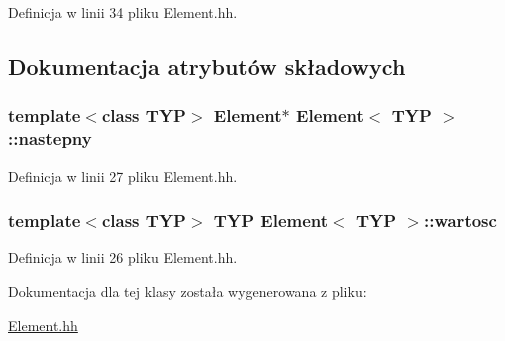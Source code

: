 Definicja w linii 34 pliku Element.hh.



\subsection{Dokumentacja atrybutów składowych}
\hypertarget{class_element_a1af602058c187cccf3f50d0c1a21047d}{
\subsubsection[{nastepny}]{\setlength{\rightskip}{0pt plus 5cm}template$<$class TYP$>$ {\bf Element}$\ast$ {\bf Element}$<$ TYP $>$::{\bf nastepny}}}
\label{class_element_a1af602058c187cccf3f50d0c1a21047d}


Definicja w linii 27 pliku Element.hh.

\hypertarget{class_element_a686c632e35d9fe961d0bf5482e1215fd}{
\subsubsection[{wartosc}]{\setlength{\rightskip}{0pt plus 5cm}template$<$class TYP$>$ TYP {\bf Element}$<$ TYP $>$::{\bf wartosc}}}
\label{class_element_a686c632e35d9fe961d0bf5482e1215fd}


Definicja w linii 26 pliku Element.hh.



Dokumentacja dla tej klasy została wygenerowana z pliku:\begin{DoxyCompactItemize}
\item 
\hyperlink{_element_8hh}{Element.hh}\end{DoxyCompactItemize}
